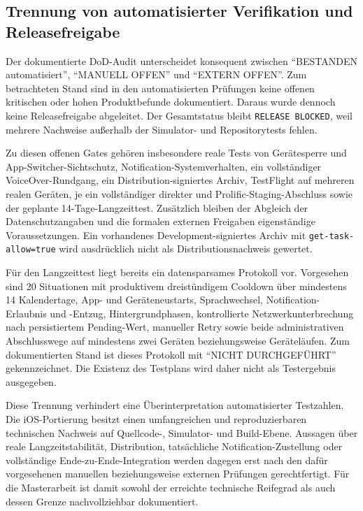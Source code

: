 \begin{neu}
\subsection{Trennung von automatisierter Verifikation und Releasefreigabe}

Der dokumentierte DoD-Audit unterscheidet konsequent zwischen \enquote{BESTANDEN automatisiert}, \enquote{MANUELL OFFEN} und \enquote{EXTERN OFFEN}. Zum betrachteten Stand sind in den automatisierten Prüfungen keine offenen kritischen oder hohen Produktbefunde dokumentiert. Daraus wurde dennoch keine Releasefreigabe abgeleitet. Der Gesamtstatus bleibt \texttt{RELEASE BLOCKED}, weil mehrere Nachweise außerhalb der Simulator- und Repositorytests fehlen.

Zu diesen offenen Gates gehören insbesondere reale Tests von Gerätesperre und App-Switcher-Sichtschutz, Notification-Systemverhalten, ein vollständiger VoiceOver-Rundgang, ein Distribution-signiertes Archiv, TestFlight auf mehreren realen Geräten, je ein vollständiger direkter und Prolific-Staging-Abschluss sowie der geplante 14-Tage-Langzeittest. Zusätzlich bleiben der Abgleich der Datenschutzangaben und die formalen externen Freigaben eigenständige Voraussetzungen. Ein vorhandenes Development-signiertes Archiv mit \texttt{get-task-allow=true} wird ausdrücklich nicht als Distributionsnachweis gewertet.

Für den Langzeittest liegt bereits ein datensparsames Protokoll vor. Vorgesehen sind 20 Situationen mit produktivem dreistündigem Cooldown über mindestens 14 Kalendertage, App- und Geräteneustarts, Sprachwechsel, Notification-Erlaubnis und -Entzug, Hintergrundphasen, kontrollierte Netzwerkunterbrechung nach persistiertem Pending-Wert, manueller Retry sowie beide administrativen Abschlusswege auf mindestens zwei Geräten beziehungsweise Geräteläufen. Zum dokumentierten Stand ist dieses Protokoll mit \enquote{NICHT DURCHGEFÜHRT} gekennzeichnet. Die Existenz des Testplans wird daher nicht als Testergebnis ausgegeben.

Diese Trennung verhindert eine Überinterpretation automatisierter Testzahlen. Die iOS-Portierung besitzt einen umfangreichen und reproduzierbaren technischen Nachweis auf Quellcode-, Simulator- und Build-Ebene. Aussagen über reale Langzeitstabilität, Distribution, tatsächliche Notification-Zustellung oder vollständige Ende-zu-Ende-Integration werden dagegen erst nach den dafür vorgesehenen manuellen beziehungsweise externen Prüfungen gerechtfertigt. Für die Masterarbeit ist damit sowohl der erreichte technische Reifegrad als auch dessen Grenze nachvollziehbar dokumentiert.
\end{neu}

